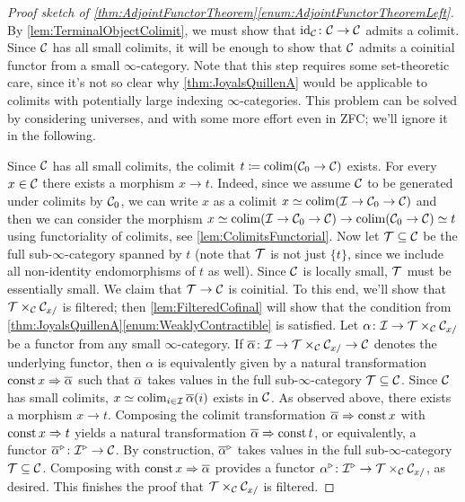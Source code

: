 \begin{proof}[Proof sketch of \cref{thm:AdjointFunctorTheorem}\cref{enum:AdjointFunctorTheoremLeft}]
	By \cref{lem:TerminalObjectColimit}, we must show that $\operatorname{id}_{\mathcal{C}}\colon \mathcal{C}\rightarrow\mathcal{C}$ admits a colimit. Since $\mathcal{C}$ has all small colimits, it will be enough to show that $\mathcal{C}$ admits a coinitial functor from a small $\infty$-category. Note that this step requires some set-theoretic care, since it's not so clear why \cref{thm:JoyalsQuillenA} would be applicable to colimits with potentially large indexing $\infty$-categories. This problem can be solved by considering universes, and with some more effort even in ZFC; we'll ignore it in the following.
	
	Since $\mathcal{C}$ has all small colimits, the colimit $t\coloneqq\operatorname*{colim}(\mathcal{C}_0\rightarrow\mathcal{C})$ exists. For every $x\in\mathcal{C}$ there exists a morphism $x\rightarrow t$. Indeed, since we assume $\mathcal{C}$ to be generated under colimits by $\mathcal{C}_0$, we can write $x$ as a colimit $x\simeq \operatorname*{colim}(\mathcal{I}\rightarrow\mathcal{C}_0\rightarrow\mathcal{C})$ and then we can consider the morphism $x\simeq \operatorname*{colim}(\mathcal{I}\rightarrow\mathcal{C}_0\rightarrow\mathcal{C})\rightarrow\operatorname*{colim}(\mathcal{C}_0\rightarrow\mathcal{C})\simeq t$ using functoriality of colimits, see \cref{lem:ColimitsFunctorial}. Now let $\mathcal{T}\subseteq \mathcal{C}$ be the full sub-$\infty$-category spanned by $t$ (note that $\mathcal{T}$ is not just $\{t\}$, since we include all non-identity endomorphisms of $t$ as well). Since $\mathcal{C}$ is locally small, $\mathcal{T}$ must be essentially small. We claim that $\mathcal{T}\rightarrow\mathcal{C}$ is coinitial. To this end, we'll show that $\mathcal{T}\times_{\mathcal{C}}\mathcal{C}_{x/}$ is filtered; then \cref{lem:FilteredCofinal} will show that the condition from \cref{thm:JoyalsQuillenA}\cref{enum:WeaklyContractible} is satisfied. Let $\alpha\colon \mathcal{I}\rightarrow\mathcal{T}\times_{\mathcal{C}}\mathcal{C}_{x/}$ be a functor from any small $\infty$-category. If $\ov\alpha\colon \Ii\rightarrow\Tt\times_\Cc\Cc_{x/}\rightarrow\Cc$ denotes the underlying functor, then $\alpha$ is equivalently given by a natural transformation $\const x\Rightarrow \ov\alpha$ such that $\ov\alpha$ takes values in the full sub-$\infty$-category $\mathcal{T}\subseteq\mathcal{C}$. Since $\mathcal{C}$ has small colimits, $x\simeq\colimit_{i\in\Ii}\ov\alpha(i)$ exists in $\mathcal{C}$. As observed above, there exists a morphism $x\rightarrow t$. Composing the colimit transformation $\ov\alpha\Rightarrow \const x$ with $\operatorname{const} x\Rightarrow t$ yields a natural transformation $\ov\alpha\Rightarrow \const t$, or equivalently, a functor $\ov\alpha^\triangleright\colon \Ii^\triangleright \rightarrow \Cc$. By construction, $\ov\alpha^\triangleright$ takes values in the full sub-$\infty$-category $\mathcal{T}\subseteq\mathcal{C}$. Composing with $\const x\Rightarrow \ov\alpha$ provides a functor $\alpha^\triangleright\colon \mathcal{I}^\triangleright\rightarrow\mathcal{T}\times_{\mathcal{C}}\mathcal{C}_{x/}$, as desired. This finishes the proof that $\mathcal{T}\times_{\mathcal{C}}\mathcal{C}_{x/}$ is filtered.%
\end{proof}
